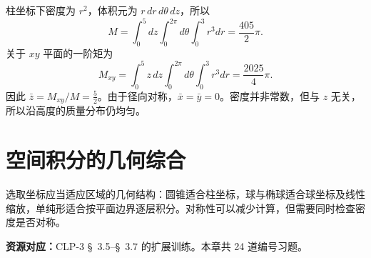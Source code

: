 \documentclass[UTF8,12pt,a4paper,fontset=fandol]{ctexart}
\begin{document}
\begin{solve}\label{ans:c38q24}
柱坐标下密度为 $r^2$，体积元为 $r\,dr\,d\theta\,dz$，所以
\[
M=\int_0^{5}dz\int_0^{2\pi}d\theta\int_0^{3}r^3dr=\frac{405}{2}\pi.
\]
关于 $xy$ 平面的一阶矩为
\[
M_{xy}=\int_0^{5}z\,dz\int_0^{2\pi}d\theta\int_0^{3}r^3dr=\frac{2025}{4}\pi.
\]
因此 $\bar z=M_{xy}/M=\frac{5}{2}$。由于径向对称，$\bar x=\bar y=0$。密度并非常数，但与 $z$ 无关，所以沿高度的质量分布仍均匀。
\end{solve}

\clearpage
\section{空间积分的几何综合}\label{sec:ch39}
选取坐标应当适应区域的几何结构：圆锥适合柱坐标，球与椭球适合球坐标及线性缩放，单纯形适合按平面边界逐层积分。对称性可以减少计算，但需要同时检查密度是否对称。

\textbf{资源对应：}CLP-3 \S~3.5--\S~3.7 的扩展训练。本章共 24 道编号习题。
\end{document}
